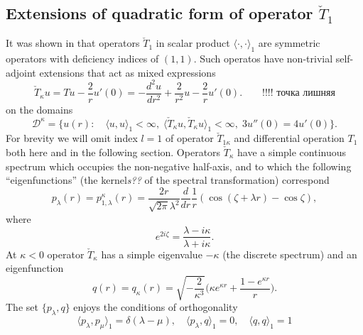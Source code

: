 \documentclass[12pt]{article}
\newcommand{\DD}{\mathcal{D}}
\begin{document}
\subsection{Extensions of quadratic form of operator $ \check{T}_{1} $}
	It was shown in
\cite{Inv}
	that operators
$ \check{T}_{1} $
	in scalar product
$ \langle \cdot , \cdot \rangle_{1} $
	are symmetric operators with deficiency indices of
$ (1,1) $.
	Such operatos have non-trivial self-adjoint extensions
	that act as mixed expressions
\begin{equation*}
    \check{T}_{\kappa} u = T u - \frac{2}{r} u'(0)
    = -\frac{d^{2}u}{dr^{2}} + \frac{2}{r^{2}} u -\frac{2}{r}u'(0) .
    \qquad\text{!!!! точка лишняя}
\end{equation*}
	on the domains
\begin{equation}
\label{cTb}
    \DD^{\kappa} = \{u(r): \quad \langle u,u\rangle_{1} < \infty, \;
	\langle \check{T}_{\kappa} u, \check{T}_{\kappa} u\rangle_{1} <\infty,
	\; 3u''(0) = 4u'(0) \} .
\end{equation}
	For brevity we will omit index
$ l=1 $
	of operator
$ \check{T}_{1\kappa} $
	and differential operation
$ T_{1} $
	both here and in the following section.
	Operators
$ \check{T}_{\kappa} $
	have a simple continuous spectrum which occupies the non-negative half-axis,
	and to which the following ``eigenfunctions'' (the kernel{\it\small s??} of the spectral transformation)
	correspond
\begin{equation*}
\label{Tpl}
    p_{\lambda}(r) = p_{1,\lambda}^{\kappa}(r)
        = \frac{2r}{\sqrt{2\pi}\lambda^{2}} \frac{d}{dr}\frac{1}{r}
    (\cos(\zeta +\lambda r) - \cos\zeta) ,
\end{equation*}
	where
\begin{equation*}
    e^{2i\zeta} = \frac{\lambda - i\kappa}{\lambda + i\kappa}.
\end{equation*}
	At
$ \kappa < 0 $
	operator
$ \check{T}_{\kappa} $
	has a simple eigenvalue
$ -\kappa $
	(the discrete spectrum) and an eigenfunction
\begin{equation*}
    q(r) = q_{\kappa}(r)
    = \sqrt{-\frac{2}{\kappa^{3}}}
        \bigl(\kappa e^{\kappa r} + \frac{1-e^{\kappa r}}{r}\bigr) .
\end{equation*}
	The set
$ \{p_{\lambda}, q \} $
	enjoys the conditions of orthogonality
\begin{equation*}
    \langle p_{\lambda} , p_{\mu} \rangle_{1} = \delta(\lambda-\mu) ,
    \quad \langle p_{\lambda} , q \rangle_{1} = 0 ,
    \quad \langle q , q \rangle_{1} = 1
\end{equation*}
\end{document}
